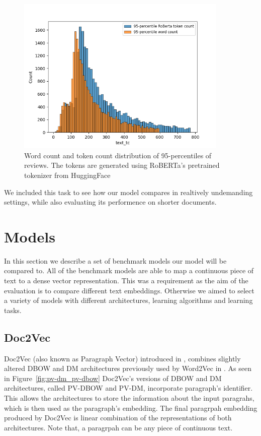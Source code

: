 \begin{figure}[ht]
  \centering
  \includegraphics[width=0.9\textwidth]{img/imdb_word_token_distributions.png}
  \caption{Word count and token count distribution of 95-percentiles of
  reviews. The tokens are generated using RoBERTa's pretrained tokenizer from
  HuggingFace}\label{fig:imdb_word_token_dist}
\end{figure}

We included this task to see how our model compares in realtively undemanding
settings, while also evaluating its performence on shorter documents.

\section{Models}

In this section we describe a set of benchmark models our model will be compared
to. All of the benchmark models are able to map a continuous piece of text to a
dense vector representation. This was a requirement as the aim of the evaluation
is to compare different text embeddings. Otherwise we aimed to select a variety
of models with different architectures, learning algorithms and learning tasks.

\subsection{Doc2Vec}

Doc2Vec (also known as Paragraph Vector) introduced in \cite{le2014distributed},
combines slightly altered DBOW and DM architectures previously used by Word2Vec
in \cite{mikolov2013efficient}. As seen in Figure~\ref{fig:pv-dm_pv-dbow} Doc2Vec's
versions of DBOW and DM architectures, called PV-DBOW and PV-DM, incorporate
paragraph's identifier. This allows the architectures to store the information
about the input paragrahs, which is then used as the paragraph's embedding. The
final paragrpah embedding produced by Doc2Vec is linear combination of the
representations of both architectures. Note that, a paragrpah can be any piece
of continuous text.

